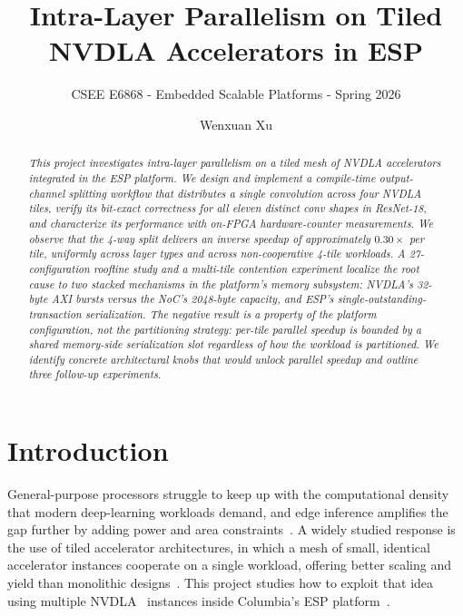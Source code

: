 \documentclass[10pt,sigconf,nonacm]{acmart}
\begin{document}
\title{Intra-Layer Parallelism on Tiled NVDLA Accelerators in ESP}
\subtitle{\normalsize CSEE E6868 - Embedded Scalable Platforms - Spring 2026}

\author{Wenxuan Xu}

\renewcommand{\shortauthors}{W. Xu}

\begin{abstract}
{\small\em
This project investigates intra-layer parallelism on a tiled mesh of NVDLA
accelerators integrated in the ESP platform. We design and implement a
compile-time output-channel splitting workflow that distributes a single
convolution across four NVDLA tiles, verify its bit-exact correctness for
all eleven distinct conv shapes in ResNet-18, and characterize its
performance with on-FPGA hardware-counter measurements. We observe that the
4-way split delivers an \emph{inverse} speedup of approximately
$0.30\times$ per tile, uniformly across layer types and across non-cooperative
4-tile workloads. A 27-configuration roofline study and a multi-tile
contention experiment localize the root cause to two stacked mechanisms in
the platform's memory subsystem: NVDLA's 32-byte AXI bursts versus the
NoC's 2048-byte capacity, and ESP's single-outstanding-transaction
serialization. The negative result is a property of the platform
configuration, not the partitioning strategy: per-tile parallel speedup
is bounded by a shared memory-side serialization slot regardless of how
the workload is partitioned. We identify concrete architectural knobs
that would unlock parallel speedup and outline three follow-up experiments.
}
\end{abstract}

\maketitle

\section{Introduction}\label{sec:intro}

General-purpose processors struggle to keep up with the computational
density that modern deep-learning workloads demand, and edge inference
amplifies the gap further by adding power and area
constraints~\cite{survey_accel}. A widely studied response is the use of
tiled accelerator architectures, in which a mesh of small, identical
accelerator instances cooperate on a single workload, offering better
scaling and yield than monolithic designs~\cite{simba}. This project
studies how to exploit that idea using multiple NVDLA~\cite{nvdla_web}
instances inside Columbia's ESP platform~\cite{esp_iccad,esp_vlsid}.
\end{document}
